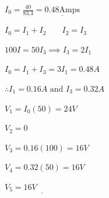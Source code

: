\begin{enumerate}
	\begin{minipage}{0.5\linewidth}
		$I_0=\frac{40}{83.3}=\underline{0.48\textrm{Amps}}$
		
		$I_0=I_1+I_2 \;\;\;\;\;\;\; I_2=I_3$
		
		$100I=50I_3\implies I_3=2I_1$
		
		$I_0=I_1+I_3=3I_1=0.48A$
		
		$\therefore I_1=0.16A \textrm{ and } I_3=0.32A$
	\end{minipage} %
	\begin{minipage}{0.5\linewidth}
		$V_1=I_0(50)=24V$
		
		$V_2=0$
		
		$V_3=0.16(100)=16V$
		
		$V_4=0.32(50)=16V$
		
		$\underline{V_5=16V \;\;\;\;\;\;\;\;\;\;\;\;\;\;\;\;\;\;\;}$
	\end{minipage} 
	
\end{enumerate}